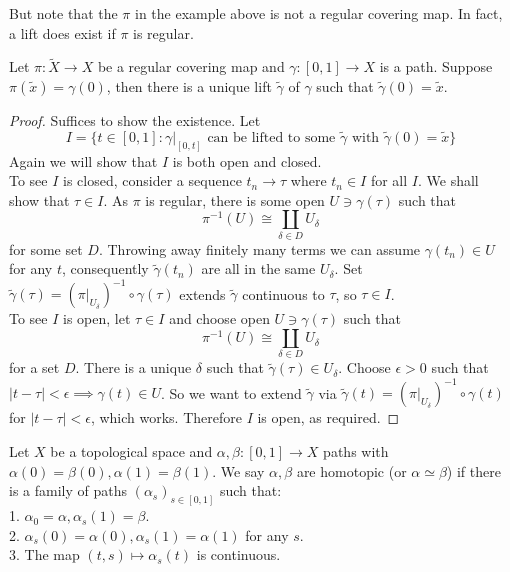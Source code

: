 But note that the $\pi$ in the example above is not a regular covering map.
In fact, a lift does exist if $\pi$ is regular.
\begin{proposition}
    Let $\pi:\tilde{X}\to X$ be a regular covering map and $\gamma:[0,1]\to X$ is a path.
    Suppose $\pi(\tilde{x})=\gamma(0)$, then there is a unique lift $\tilde\gamma$ of $\gamma$ such that $\tilde{\gamma}(0)=\tilde{x}$.
\end{proposition}
\begin{proof}
    Suffices to show the existence.
    Let
    $$I=\{t\in [0,1]:\gamma|_{[0,t]}\text{ can be lifted to some }\tilde\gamma\text{ with }\tilde{\gamma}(0)=\tilde{x}\}$$
    Again we will show that $I$ is both open and closed.\\
    To see $I$ is closed, consider a sequence $t_n\to\tau$ where $t_n\in I$ for all $I$.
    We shall show that $\tau\in I$.
    As $\pi$ is regular, there is some open $U\ni\gamma(\tau)$ such that
    $$\pi^{-1}(U)\cong\coprod_{\delta\in D}U_\delta$$
    for some set $D$.
    Throwing away finitely many terms we can assume $\gamma(t_n)\in U$ for any $t$, consequently $\tilde{\gamma}(t_n)$ are all in the same $U_\delta$.
    Set $\tilde{\gamma}(\tau)=(\pi|_{U_\delta})^{-1}\circ\gamma(\tau)$ extends $\tilde{\gamma}$ continuous to $\tau$, so $\tau\in I$.\\
    To see $I$ is open, let $\tau\in I$ and choose open $U\ni \gamma(\tau)$ such that
    $$\pi^{-1}(U)\cong\coprod_{\delta\in D}U_\delta$$
    for a set $D$.
    There is a unique $\delta$ such that $\tilde{\gamma}(\tau)\in U_\delta$.
    Choose $\epsilon>0$ such that $|t-\tau|<\epsilon\implies \gamma(t)\in U$.
    So we want to extend $\tilde{\gamma}$ via $\tilde\gamma(t)=(\pi|_{U_\delta})^{-1}\circ\gamma(t)$ for $|t-\tau|<\epsilon$, which works.
    Therefore $I$ is open, as required.
\end{proof}
\begin{definition}
    Let $X$ be a topological space and $\alpha,\beta:[0,1]\to X$ paths with $\alpha(0)=\beta(0),\alpha(1)=\beta(1)$.
    We say $\alpha,\beta$ are homotopic (or $\alpha\simeq\beta$) if there is a family of paths $(\alpha_s)_{s\in[0,1]}$ such that:\\
    1. $\alpha_0=\alpha,\alpha_s(1)=\beta$.\\
    2. $\alpha_s(0)=\alpha(0),\alpha_s(1)=\alpha(1)$ for any $s$.\\
    3. The map $(t,s)\mapsto\alpha_s(t)$ is continuous.
\end{definition}
